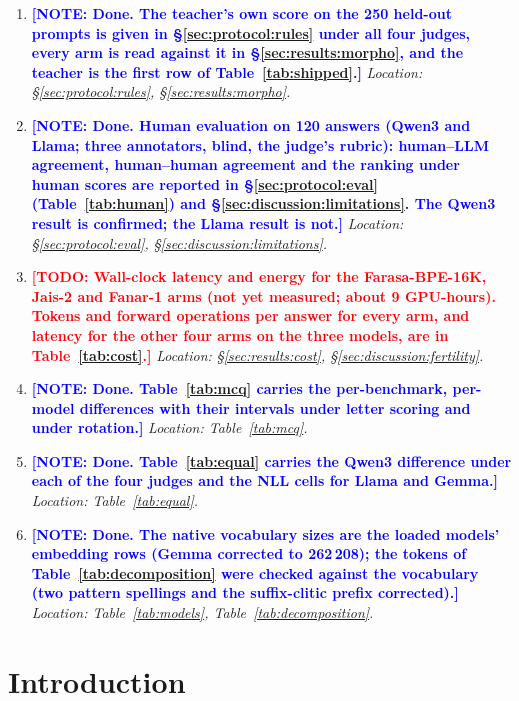 \documentclass[a4paper,fleqn]{cas-sc}
\newcommand{\todo}[1]{\textcolor{red}{\textbf{[\textsc{TODO}: #1]}}}
\newcommand{\note}[1]{\textcolor{blue}{\textbf{[NOTE: #1]}}}
\begin{document}
\begin{enumerate}
\item \note{Done. The teacher's own score on the 250 held-out prompts is given in \S\ref{sec:protocol:rules} under all four judges, every arm is read against it in \S\ref{sec:results:morpho}, and the teacher is the first row of Table~\ref{tab:shipped}.} \emph{Location: \S\ref{sec:protocol:rules}, \S\ref{sec:results:morpho}.}
\item \note{Done. Human evaluation on 120 answers (Qwen3 and Llama; three annotators, blind, the judge's rubric): human--LLM agreement, human--human agreement and the ranking under human scores are reported in \S\ref{sec:protocol:eval} (Table~\ref{tab:human}) and \S\ref{sec:discussion:limitations}. The Qwen3 result is confirmed; the Llama result is not.} \emph{Location: \S\ref{sec:protocol:eval}, \S\ref{sec:discussion:limitations}.}
\item \todo{Wall-clock latency and energy for the Farasa-BPE-16K, Jais-2 and Fanar-1 arms (not yet measured; about 9 GPU-hours). Tokens and forward operations per answer for every arm, and latency for the other four arms on the three models, are in Table~\ref{tab:cost}.} \emph{Location: \S\ref{sec:results:cost}, \S\ref{sec:discussion:fertility}.}
\item \note{Done. Table~\ref{tab:mcq} carries the per-benchmark, per-model differences with their intervals under letter scoring and under rotation.} \emph{Location: Table~\ref{tab:mcq}.}
\item \note{Done. Table~\ref{tab:equal} carries the Qwen3 difference under each of the four judges and the NLL cells for Llama and Gemma.} \emph{Location: Table~\ref{tab:equal}.}
\item \note{Done. The native vocabulary sizes are the loaded models' embedding rows (Gemma corrected to 262\,208); the tokens of Table~\ref{tab:decomposition} were checked against the vocabulary (two pattern spellings and the suffix-clitic prefix corrected).} \emph{Location: Table~\ref{tab:models}, Table~\ref{tab:decomposition}.}
\end{enumerate}

\newpage

\section{Introduction}
\label{sec:intro}
\end{document}
